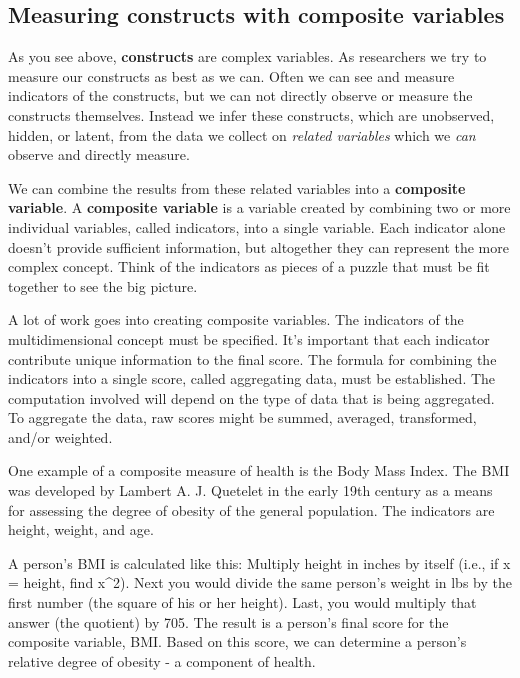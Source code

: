 \documentclass[
]{book}
\begin{document}
\hypertarget{measuring-constructs-with-composite-variables}{%
\subsection{Measuring constructs with composite variables}\label{measuring-constructs-with-composite-variables}}

As you see above, \textbf{constructs} are complex variables. As researchers we try to measure our constructs as best as we can. Often we can see and measure indicators of the constructs, but we can not directly observe or measure the constructs themselves. Instead we infer these constructs, which are unobserved, hidden, or latent, from the data we collect on \emph{related variables} which we \emph{can} observe and directly measure.

We can combine the results from these related variables into a \textbf{composite variable}. A \textbf{composite variable} is a variable created by combining two or more individual variables, called indicators, into a single variable. Each indicator alone doesn't provide sufficient information, but altogether they can represent the more complex concept. Think of the indicators as pieces of a puzzle that must be fit together to see the big picture.

A lot of work goes into creating composite variables. The indicators of the multidimensional concept must be specified. It's important that each indicator contribute unique information to the final score. The formula for combining the indicators into a single score, called aggregating data, must be established. The computation involved will depend on the type of data that is being aggregated. To aggregate the data, raw scores might be summed, averaged, transformed, and/or weighted.

One example of a composite measure of health is the Body Mass Index. The BMI was developed by Lambert A. J. Quetelet in the early 19th century as a means for assessing the degree of obesity of the general population. The indicators are height, weight, and age.

A person's BMI is calculated like this: Multiply height in inches by itself (i.e., if x = height, find x\^{}2). Next you would divide the same person's weight in lbs by the first number (the square of his or her height). Last, you would multiply that answer (the quotient) by 705. The result is a person's final score for the composite variable, BMI. Based on this score, we can determine a person's relative degree of obesity - a component of health.
\end{document}
